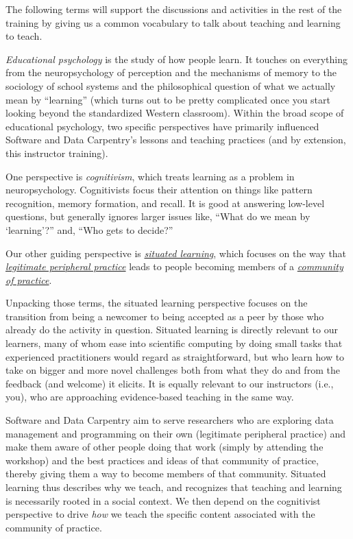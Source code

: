 
The following terms will support the discussions and activities in the
rest of the training by giving us a common vocabulary to talk about
teaching and learning to teach.


\emph{Educational psychology} is the study of how people learn. It
touches on everything from the neuropsychology of perception and the
mechanisms of memory to the sociology of school systems and the
philosophical question of what we actually mean by ``learning'' (which
turns out to be pretty complicated once you start looking beyond the
standardized Western classroom). Within the broad scope of educational
psychology, two specific perspectives have primarily influenced Software
and Data Carpentry's lessons and teaching practices (and by extension,
this instructor training).

One perspective is \emph{cognitivism}, which treats learning as a
problem in neuropsychology. Cognitivists focus their attention on things
like pattern recognition, memory formation, and recall. It is good at
answering low-level questions, but generally ignores larger issues like,
``What do we mean by `learning'?'' and, ``Who gets to decide?''

Our other guiding perspective is
\emph{\href{https://en.wikipedia.org/wiki/Situated\_learning}{situated
learning}}, which focuses on the way that
\emph{\href{https://en.wikipedia.org/wiki/Legitimate\_peripheral\_participation}{legitimate
peripheral practice}} leads to people becoming members of a
\emph{\href{https://en.wikipedia.org/wiki/Community\_of\_practice}{community
of practice}}.

Unpacking those terms, the situated learning perspective focuses on the
transition from being a newcomer to being accepted as a peer by those
who already do the activity in question. Situated learning is directly
relevant to our learners, many of whom ease into scientific computing by
doing small tasks that experienced practitioners would regard as
straightforward, but who learn how to take on bigger and more novel
challenges both from what they do and from the feedback (and welcome) it
elicits. It is equally relevant to our instructors (i.e., you), who are
approaching evidence-based teaching in the same way.

Software and Data Carpentry aim to serve researchers who are exploring
data management and programming on their own (legitimate peripheral
practice) and make them aware of other people doing that work (simply by
attending the workshop) and the best practices and ideas of that
community of practice, thereby giving them a way to become members of
that community. Situated learning thus describes why we teach, and
recognizes that teaching and learning is necessarily rooted in a social
context. We then depend on the cognitivist perspective to drive
\emph{how} we teach the specific content associated with the community
of practice.

